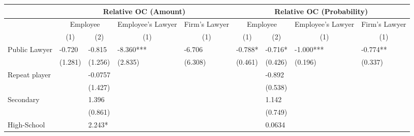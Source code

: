 \begin{tabular}{lrrrrrrrr}
\toprule
      & \multicolumn{4}{c}{Relative OC (Amount)} & \multicolumn{4}{c}{Relative OC (Probability)} \\
\midrule
      & \multicolumn{2}{c}{Employee} & \multicolumn{1}{c}{Employee's Lawyer} & \multicolumn{1}{c}{Firm's  Lawyer} & \multicolumn{2}{c}{Employee} & \multicolumn{1}{c}{Employee's Lawyer} & \multicolumn{1}{c}{Firm's  Lawyer} \\
      & \multicolumn{1}{c}{(1)} & \multicolumn{1}{c}{(2)} & \multicolumn{1}{c}{(1)} & \multicolumn{1}{c}{(1)} & \multicolumn{1}{c}{(1)} & \multicolumn{1}{c}{(2)} & \multicolumn{1}{c}{(1)} & \multicolumn{1}{c}{(1)} \\
      \midrule
Public Lawyer & \multicolumn{1}{l}{-0.720} & \multicolumn{1}{l}{-0.815} & \multicolumn{1}{l}{-8.360***} & \multicolumn{1}{l}{-6.706} & \multicolumn{1}{l}{-0.788*} & \multicolumn{1}{l}{-0.716*} & \multicolumn{1}{l}{-1.000***} & \multicolumn{1}{l}{-0.774**} \\
      & \multicolumn{1}{l}{(1.281)} & \multicolumn{1}{l}{(1.256)} & \multicolumn{1}{l}{(2.835)} & \multicolumn{1}{l}{(6.308)} & \multicolumn{1}{l}{(0.461)} & \multicolumn{1}{l}{(0.426)} & \multicolumn{1}{l}{(0.196)} & \multicolumn{1}{l}{(0.337)} \\
Repeat player & \multicolumn{1}{l}{} & \multicolumn{1}{l}{-0.0757} & \multicolumn{1}{l}{} & \multicolumn{1}{l}{} & \multicolumn{1}{l}{} & \multicolumn{1}{l}{-0.892} & \multicolumn{1}{l}{} & \multicolumn{1}{l}{} \\
      & \multicolumn{1}{l}{} & \multicolumn{1}{l}{(1.427)} & \multicolumn{1}{l}{} & \multicolumn{1}{l}{} & \multicolumn{1}{l}{} & \multicolumn{1}{l}{(0.538)} & \multicolumn{1}{l}{} & \multicolumn{1}{l}{} \\
Secondary & \multicolumn{1}{l}{} & \multicolumn{1}{l}{1.396} & \multicolumn{1}{l}{} & \multicolumn{1}{l}{} & \multicolumn{1}{l}{} & \multicolumn{1}{l}{1.142} & \multicolumn{1}{l}{} & \multicolumn{1}{l}{} \\
      & \multicolumn{1}{l}{} & \multicolumn{1}{l}{(0.861)} & \multicolumn{1}{l}{} & \multicolumn{1}{l}{} & \multicolumn{1}{l}{} & \multicolumn{1}{l}{(0.749)} & \multicolumn{1}{l}{} & \multicolumn{1}{l}{} \\
High-School & \multicolumn{1}{l}{} & \multicolumn{1}{l}{2.243*} & \multicolumn{1}{l}{} & \multicolumn{1}{l}{} & \multicolumn{1}{l}{} & \multicolumn{1}{l}{0.0634} & \multicolumn{1}{l}{} & \multicolumn{1}{l}{} \\

\end{tabular}
